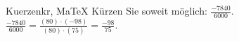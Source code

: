 \begin{MAufgabe}{Kuerzen}{kr, MaTeX}
K\"urzen Sie soweit m\"oglich: $\frac{-7840}{6000}$.\\ 
\ifLsg\MLoesung
\quad $\frac{-7840}{6000}=\frac{(80)\cdot(-98)}{(80)\cdot(75)}=\frac{-98}{75}$.\else\relax\fi
 \end{MAufgabe}
